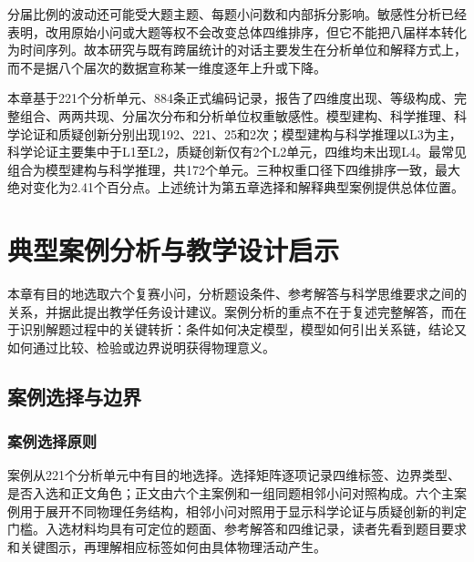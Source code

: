 \documentclass[
  12pt,
  a4paper,twoside,openany]{ctexbook}
\begin{document}
分届比例的波动还可能受大题主题、每题小问数和内部拆分影响。敏感性分析已经表明，改用原始小问或大题等权不会改变总体四维排序，但它不能把八届样本转化为时间序列。故本研究与既有跨届统计的对话主要发生在分析单位和解释方式上，而不是据八个届次的数据宣称某一维度逐年上升或下降。

本章基于221个分析单元、884条正式编码记录，报告了四维度出现、等级构成、完整组合、两两共现、分届次分布和分析单位权重敏感性。模型建构、科学推理、科学论证和质疑创新分别出现192、221、25和2次；模型建构与科学推理以L3为主，科学论证主要集中于L1至L2，质疑创新仅有2个L2单元，四维均未出现L4。最常见组合为模型建构与科学推理，共172个单元。三种权重口径下四维排序一致，最大绝对变化为2.41个百分点。上述统计为第五章选择和解释典型案例提供总体位置。

\chapter{典型案例分析与教学设计启示}\label{ux5178ux578bux6848ux4f8bux5206ux6790ux4e0eux6559ux5b66ux8bbeux8ba1ux542fux793a}

本章有目的地选取六个复赛小问，分析题设条件、参考解答与科学思维要求之间的关系，并据此提出教学任务设计建议。案例分析的重点不在于复述完整解答，而在于识别解题过程中的关键转折：条件如何决定模型，模型如何引出关系链，结论又如何通过比较、检验或边界说明获得物理意义。

\section{案例选择与边界}\label{ux6848ux4f8bux9009ux62e9ux4e0eux8fb9ux754c}

\subsection{案例选择原则}\label{ux6848ux4f8bux9009ux62e9ux539fux5219}

案例从221个分析单元中有目的地选择。选择矩阵逐项记录四维标签、边界类型、是否入选和正文角色；正文由六个主案例和一组同题相邻小问对照构成。六个主案例用于展开不同物理任务结构，相邻小问对照用于显示科学论证与质疑创新的判定门槛。入选材料均具有可定位的题面、参考解答和四维记录，读者先看到题目要求和关键图示，再理解相应标签如何由具体物理活动产生。
\end{document}
